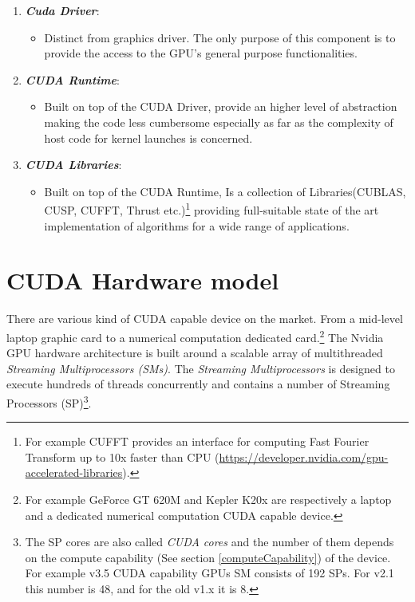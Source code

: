 \begin{enumerate}
\item \textit{\textbf{Cuda Driver}}:
	\begin{itemize}
	  \item Distinct from graphics driver. The only purpose of this component is to
	  provide the access to the GPU's general purpose functionalities.
	\end{itemize}
\item \textit{\textbf{CUDA Runtime}}:
	\begin{itemize}
	  \item Built on top of the CUDA Driver, provide an higher level of
	  abstraction making the code less cumbersome  especially as far as the
	  complexity of host code for kernel launches is concerned. 
	\end{itemize}
\item \textit{\textbf{CUDA Libraries}}:
 \begin{itemize}
	  \item Built on top of the CUDA Runtime, Is a collection of Libraries(CUBLAS,
	  CUSP, CUFFT, Thrust etc.)\footnote{For example CUFFT
	  provides an interface for computing Fast Fourier Transform
	  up to 10x faster than CPU
	  (\url{https://developer.nvidia.com/gpu-accelerated-libraries}).} providing full-suitable state of the art implementation of algorithms for a wide range of applications.
	\end{itemize}
\end{enumerate}


\FloatBarrier


\section{CUDA Hardware model}
There are various kind of CUDA capable device on the market. From a mid-level
laptop graphic card to a numerical computation dedicated
card.\footnote{For example GeForce GT 620M and Kepler K20x are respectively a
laptop and a dedicated numerical computation CUDA capable device.}
The Nvidia GPU hardware architecture is built around a scalable array of multithreaded \emph{Streaming Multiprocessors (SMs)}.
The \emph{Streaming Multiprocessors} is designed to execute hundreds of threads
concurrently  and contains a number of Streaming Processors (SP)\footnote{The SP
cores are also called \emph{CUDA cores} and the number of them depends on the
compute capability (See section \ref{computeCapability}) of the device. For
example v3.5 CUDA capability GPUs SM consists of 192 SPs. For v2.1
this number is 48, and for the old v1.x it is 8.}.





